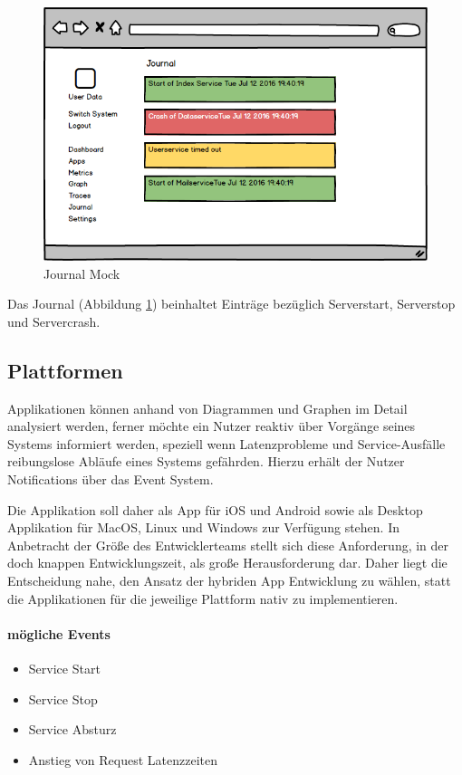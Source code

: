 \begin{figure}[h]
 \centering
 \includegraphics[width=0.7\linewidth]{kapitel1/mocks/journal.png}
 \caption{Journal Mock}
 \label{fig:journalmock}
\end{figure}

Das Journal (Abbildung \ref{fig:journalmock}) beinhaltet Einträge bezüglich Serverstart, Serverstop und Servercrash.


\newpage

\subsection{Plattformen}

Applikationen können anhand von Diagrammen und Graphen im Detail analysiert werden,
ferner möchte ein Nutzer reaktiv über Vorgänge seines Systems informiert werden, speziell wenn Latenzprobleme und Service-Ausfälle reibungslose Abläufe eines Systems gefährden.
Hierzu erhält der Nutzer Notifications über das Event System.

Die Applikation soll daher als App für iOS und Android sowie als Desktop Applikation für MacOS, Linux und Windows zur Verfügung stehen.
In Anbetracht der Größe des Entwicklerteams stellt sich diese Anforderung, in der doch knappen Entwicklungszeit, als große Herausforderung dar.
Daher liegt die Entscheidung nahe, den Ansatz der hybriden App Entwicklung zu wählen, statt die Applikationen für die jeweilige Plattform nativ zu implementieren.

\paragraph{mögliche Events}
\begin{itemize}
\item Service Start
\item Service Stop
\item Service Absturz
\item Anstieg von Request Latenzzeiten
\end{itemize}
